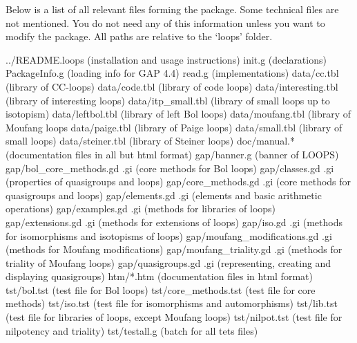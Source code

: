 
Below is a list of all relevant files forming the {\LOOPS} package. Some
technical files are not mentioned. You do not need any of this information
unless you want to modify the package. All paths are relative to the
`loops' folder.

\begintt
../README.loops (installation and usage instructions)
init.g (declarations)
PackageInfo.g (loading info for GAP 4.4)
read.g (implementations)
data/cc.tbl (library of CC-loops)
data/code.tbl (library of code loops)
data/interesting.tbl (library of interesting loops)
data/itp_small.tbl (library of small loops up to isotopism)
data/leftbol.tbl (library of left Bol loops)
data/moufang.tbl (library of Moufang loops
data/paige.tbl (library of Paige loops)
data/small.tbl (library of small loops)
data/steiner.tbl (library of Steiner loops)
doc/manual.* (documentation files in all but html format)
gap/banner.g (banner of LOOPS)
gap/bol_core_methods.gd .gi (core methods for Bol loops)
gap/classes.gd .gi (properties of quasigroups and loops)
gap/core_methods.gd .gi (core methods for quasigroups and loops)
gap/elements.gd .gi (elements and basic arithmetic operations)
gap/examples.gd .gi (methods for libraries of loops)
gap/extensions.gd .gi (methods for extensions of loops)
gap/iso.gd .gi (methods for isomorphisms and isotopisms of loops)
gap/moufang_modifications.gd .gi (methods for Moufang modifications)
gap/moufang_triality.gd .gi (methods for triality of Moufang loops)
gap/quasigroups.gd .gi (representing, creating and displaying quasigroups)
htm/*.htm (documentation files in html format)
tst/bol.tst (test file for Bol loops)
tst/core_methods.tst (test file for core methods)
tst/iso.tst (test file for isomorphisms and automorphisms)
tst/lib.tst (test file for libraries of loops, except Moufang loops)
tst/nilpot.tst (test file for nilpotency and triality)
tst/testall.g (batch for all tets files)
\endtt
